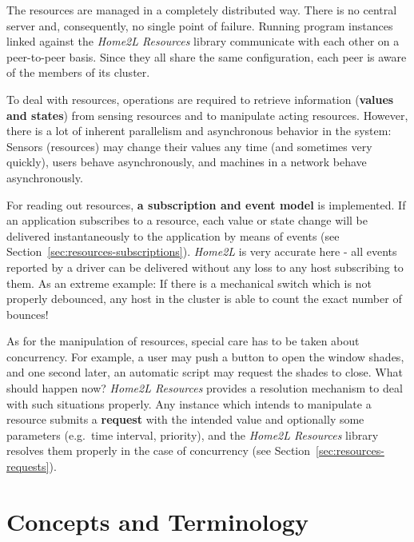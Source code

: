 \documentclass[12pt,english,parskip=half,headheight=19pt]{scrreprt}
\begin{document}
The resources are managed in a completely distributed way. There is no
central server and, consequently, no single point of failure. Running
program instances linked against the \textit{Home2L Resources} library communicate
with each other on a peer-to-peer basis. Since they all share the same
configuration, each peer is aware of the members of its cluster.

To deal with resources, operations are required to retrieve information
(\textbf{values and states}) from sensing resources and to manipulate acting
resources. However, there is a lot of inherent parallelism and asynchronous
behavior in the system: Sensors (resources) may change their values any
time (and sometimes very quickly), users behave asynchronously, and
machines in a network behave asynchronously.

For reading out resources, \textbf{a subscription and event model} is implemented.
If an application subscribes to a resource, each value or state
change will be delivered instantaneously to the application by means of
events (see Section~\ref{sec:resources-subscriptions}).
\textit{Home2L} is very accurate here - all events reported by a driver can be delivered without
any loss to any host subscribing to them. As an extreme example: If there is a
mechanical switch which is not properly debounced, any host in the
cluster is able to count the exact number of bounces!

As for the manipulation of resources, special care has to be taken about
concurrency. For example, a user may push a button to open the window
shades, and one second later, an automatic script may request the
shades to close. What should happen now?
\textit{Home2L Resources} provides
a resolution mechanism to deal with such situations properly. Any
instance which intends to manipulate a resource submits a \textbf{request}
with the intended value and optionally some parameters (e.g.~time interval,
priority), and the \textit{Home2L Resources} library resolves them
properly in the case of concurrency (see Section~\ref{sec:resources-requests}).





\section{Concepts and Terminology}
\label{sec:resources-terminology}
\end{document}
